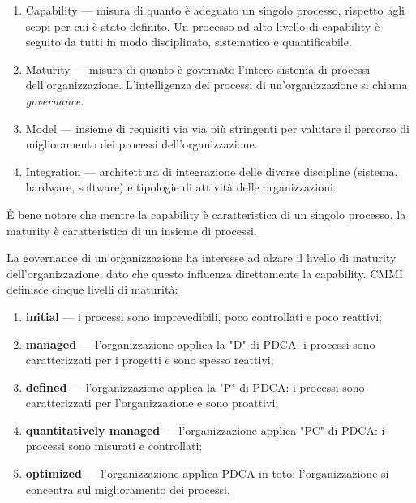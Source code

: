 \documentclass[a4paper]{article}
\begin{document}
	\begin{enumerate}
		
			
	\item Capability — misura di quanto è adeguato un singolo processo, rispetto agli scopi per cui è stato definito. Un processo ad alto livello di capability è seguito da tutti in modo disciplinato, sistematico e quantificabile.
			
	\item Maturity — misura di quanto è governato l'intero sistema di processi dell'organizzazione. L'intelligenza dei processi di un'organizzazione si chiama \emph{governance}.
			
	\item Model — insieme di requisiti via via più stringenti per valutare il percorso di miglioramento dei processi dell'organizzazione.
			
	\item Integration — architettura di integrazione delle diverse discipline (sistema, hardware, software) e tipologie di attività delle organizzazioni.
		
	\end{enumerate}

		
È bene notare che mentre la capability è caratteristica di un singolo processo, la maturity è caratteristica di un insieme di processi.
		
La governance di un'organizzazione ha interesse ad alzare il livello di maturity dell'organizzazione, dato che questo influenza direttamente la capability. CMMI definisce cinque livelli di maturità:
		
	\begin{enumerate}
		
			
	\item \textbf{initial} — i processi sono imprevedibili, poco controllati e poco reattivi;
			
	\item \textbf{managed} — l'organizzazione applica la "D" di PDCA: i processi sono caratterizzati per i progetti e sono spesso reattivi;
			
	\item \textbf{defined} — l'organizzazione applica la "P" di PDCA: i processi sono caratterizzati per l'organizzazione e sono proattivi;
			
	\item \textbf{quantitatively managed} — l'organizzazione applica "PC" di PDCA: i processi sono misurati e controllati;
			
	\item \textbf{optimized} — l'organizzazione applica PDCA in toto: l'organizzazione si concentra sul miglioramento dei processi.
		
	\end{enumerate}
\end{document}

